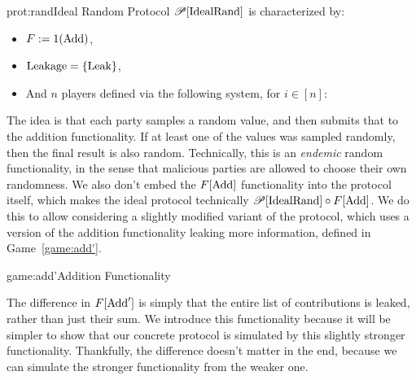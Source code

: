 \begin{protocol}{prot:rand}{Ideal Random Protocol}
$\mathscr{P}[\text{IdealRand}]$ is characterized by:
\begin{itemize}
    \item $F := 1(\text{Add})$,
    \item $\text{Leakage} = \{\text{Leak}\}$,
    \item And $n$ players defined via the following system, for $i \in [n]$:
\end{itemize}
\end{protocol}

The idea is that each party samples a random value, and then submits
that to the addition functionality.
If at least one of the values was sampled randomly, 
then the final result is also random.
Technically, this is an \emph{endemic} random functionality,
in the sense that malicious parties are allowed to choose their own randomness.
We also don't embed the $F[\text{Add}]$ functionality into the protocol itself,
which makes the ideal protocol technically $\mathscr{P}[\text{IdealRand}] \circ F[\text{Add}]$.
We do this to allow considering a slightly modified variant of the protocol,
which uses a version of the addition functionality leaking more information,
defined in Game~\ref{game:add'}.

\begin{game}{game:add'}{Addition Functionality}
\end{game}

The difference in $F[\text{Add}']$ is simply that the entire list of contributions
is leaked, rather than just their sum.
We introduce this functionality because it will be simpler
to show that our concrete protocol is simulated by this slightly stronger functionality.
Thankfully, the difference doesn't matter in the end, because we can simulate
the stronger functionality from the weaker one.

